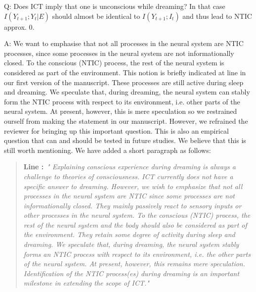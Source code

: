 \documentclass[utf8]{article}
\newcounter{cQuestion}[section]
\newenvironment{question}
    {\refstepcounter{cQuestion}\color{Blue}\noindent\newline Q\thecQuestion:}
    {~\newline}
\newenvironment{ans}  
    {\color{Black}\noindent A:}
    {~\newline}
\newcommand{\addnew}[2]{\blockcquote{}{\textbf{Line #1:}~\newline\textit{"#2"}}
}
\begin{document}
        \begin{question}
            Does ICT imply that one is unconscious while dreaming? In that case $I(Y_{t+1}; Y_t|E)$ should almost be identical to $I(Y_{t+1};I_t)$ and thus lead to NTIC approx. 0.        
        \end{question}
    
    	\begin{ans}
	    	We want to emphasise that not all processes in the neural system are NTIC processes, since some processes in the neural system are not informationally closed.
	    	To the conscious (NTIC) process, the rest of the neural system is considered as part of the environment. This notion is briefly indicated at line  in our first version of the manuscript. These processes are still active during sleep and dreaming. We speculate that, during dreaming, the neural system can stably form the NTIC process with respect to its environment, i.e. other parts of the neural system. At present, however, this is mere speculation so we restrained ourself from making the statement in our manuscript. However, we refrained the reviewer for bringing up this important question. This is also an empirical question that can and should be tested in future studies. We believe that this is still worth mentioning. We have added a short paragraph as follows:
	    	
			\addnew{}{
			Explaining conscious experience during dreaming is always a challenge to theories of consciousness. ICT currently does not have a specific answer to dreaming. However, we wish to emphasize that not all processes in the neural system are NTIC since some processes are not informationally closed. They mainly passively react to sensory inputs or other processes in the neural system. To the conscious (NTIC) process, the rest of the neural system and the body should also be considered as part of the environment. They retain some degree of activity during sleep and dreaming. We speculate that, during dreaming, the neural system stably forms an NTIC process with respect to its environment, i.e. the other parts of the neural system. At present, however, this remains mere speculation. Identification of the NTIC process(es) during dreaming is an important milestone in extending the scope of ICT.}
    	\end{ans}
        
\end{document}
